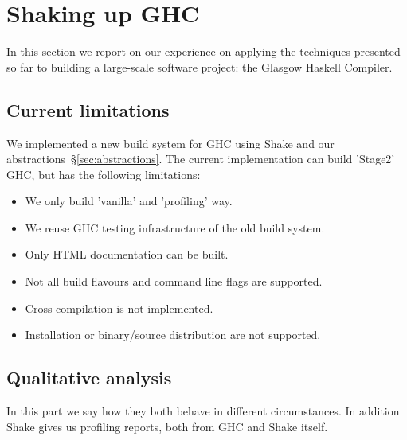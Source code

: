 \section{Shaking up GHC\label{sec:ghc}}

In this section we report on our experience on applying the techniques presented
so far to building a large-scale software project: the Glasgow Haskell Compiler.

\subsection{Current limitations\label{sec:limitations}}

We implemented a new build system for GHC using Shake and our
abstractions~\S\ref{sec:abstractions}. The current implementation can build
\lst'Stage2' GHC, but has the following limitations:
\begin{itemize}
  \item We only build \lst'vanilla' and \lst'profiling' way.
  \item We reuse GHC testing infrastructure of the old build system.
  \item Only HTML documentation can be built.
  \item Not all build flavours and command line flags are supported.
  \item Cross-compilation is not implemented.
  \item Installation or binary/source distribution are not supported.
\end{itemize}

\subsection{Qualitative analysis}

In this part we say how they both behave in different circumstances. In addition Shake gives us profiling reports, both from GHC and Shake itself.

